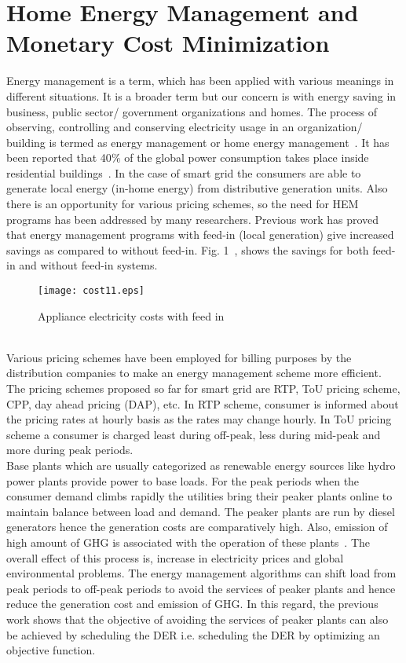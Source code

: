 \documentclass[journal]{IEEEtran}
\begin{document}
\section{Home Energy Management and Monetary Cost Minimization}
Energy management is a term, which has been applied with various meanings in different situations. It is a broader term but our concern is with energy saving in  business, public sector/ government organizations and homes. The process of observing, controlling and conserving electricity usage in an organization/ building is  termed as energy management or home energy management~\cite{kailas2012survey}. It has been reported that 40$\%$ of the global power consumption takes place inside residential buildings~\cite{Ullah2013survey}. In the case of smart grid the consumers are able to generate local energy (in-home energy) from distributive generation units. Also there is an opportunity for various pricing schemes, so the need for HEM programs has been addressed by many researchers. Previous work has proved that energy management programs with feed-in (local generation) give increased savings as compared to without feed-in. Fig. 1~\cite{erol2011wireless}, shows the savings for both feed-in and without feed-in systems.
\begin{figure}[!h]
\centering
\texttt{[image: cost11.eps]}
\caption{Appliance electricity costs with feed in }
\end{figure}\\
\indent Various pricing schemes have been employed for billing purposes by the distribution companies to make an energy management scheme more efficient. The pricing schemes proposed so far for smart grid are RTP, ToU pricing scheme, CPP, day ahead pricing (DAP), etc. In RTP scheme, consumer is informed about the pricing rates at hourly basis as the rates may change hourly. In ToU pricing scheme a consumer is charged least during off-peak, less during mid-peak and more during peak periods.\\
\indent Base plants which are usually categorized as renewable energy sources like hydro power plants provide power to base loads. For the peak periods when the consumer demand climbs rapidly the utilities bring their peaker plants online to maintain balance between load and demand. The peaker plants are run by diesel generators hence the generation costs are comparatively high. Also, emission of high amount of GHG is associated with the operation of these plants~\cite{erol2011wireless}. The overall effect of this process is, increase in electricity prices and global environmental problems. The energy management algorithms can shift load from peak periods to off-peak periods to avoid the services of peaker plants and hence reduce the generation cost and emission of GHG. In this regard, the previous work shows that the objective of avoiding the services of peaker plants can also be achieved by scheduling the DER i.e. scheduling the DER by optimizing an objective function.\\
\end{document}
